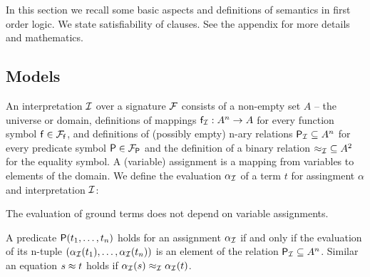 In this section we recall some basic aspects and definitions of semantics in first order logic. 
We state satisfiability of clauses. See the appendix for more details and mathematics.

\subsection{Models}

\begin{definition}\label{def:interpretation}
	An {\myem interpretation} ${\mathcal I}$ over a signature ${\mathcal F}$ consists of a
	non-empty set $A$ -- the {\myem universe} or {\myem domain},
	definitions of mappings ${\mathsf f}_{\mathcal I}: A^n\rightarrow A$ for every function symbol ${\mathsf f}\in{{\mathcal F}_{\mathsf f}}$, 
	and definitions of (possibly empty) n-ary relations 
	 ${{\mathsf P}_{\mathcal I}}\subseteq A^n$ for every predicate symbol ${\mathsf P}\in{{\mathcal F}_{\mathsf P}}$
	 and the definition of a binary relation ${\approx_{\mathcal I}}\subseteq A^2$ for the equality symbol.
	 A (variable) {\myem assignment} is a mapping from variables to elements of the domain.
	 We define the {\myem evaluation} $\alpha_{\mathcal I}$ of a term $t$ 
	 for assingment $\alpha$ and interpretation ${\mathcal I}$:
\begin{remark}
	The evaluation of ground terms does not depend on variable assignments.
\end{remark}
\end{definition}

\begin{definition}\label{def:semantics:atoms}
	A predicate ${\mathsf P}(t_1,\ldots,t_n)$ 
	{\myem holds} for an assignment $\alpha_{\mathcal I}$ 
	if and only if the evaluation of its n-tuple $
	(\alpha_{\mathcal I}({t_1}),\ldots,\alpha_{\mathcal I}({t_n}))$
	is an element of the relation ${\mathsf P}_{\mathcal I}\subseteq A^n$.
	Similar an equation $s\approx t$ 
	holds if $\alpha_{\mathcal I}(s) \approx_{\mathcal I} \alpha_{\mathcal I}(t)$.
\end{definition}

